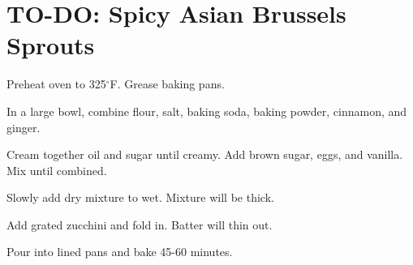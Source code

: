 \section{TO-DO: Spicy Asian Brussels Sprouts}
\begin{recipe}
	
	
	
	
	Preheat oven to 325$^{\circ}$F. Grease baking pans.
	
	In a large bowl, combine flour, salt, baking soda, baking powder, cinnamon, and ginger.
	
	Cream together oil and sugar until creamy. Add brown sugar, eggs, and vanilla. Mix until combined.
	
	Slowly add dry mixture to wet. Mixture will be thick.
	
	Add grated zucchini and fold in. Batter will thin out.
	
	Pour into lined pans and bake 45-60 minutes.
	
	
	
\end{recipe}
